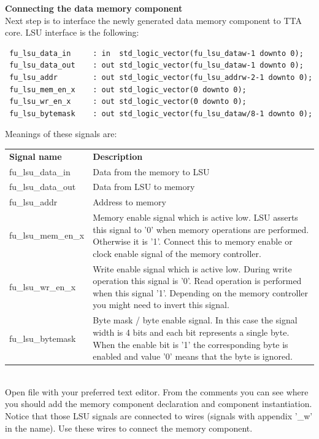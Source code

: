 \documentclass[twoside]{tceusermanual}
\begin{document}
\textbf{Connecting the data memory component} \\
Next step is to interface the newly generated data memory component to TTA
core. LSU interface is the following:
\begin{verbatim}
 fu_lsu_data_in     : in  std_logic_vector(fu_lsu_dataw-1 downto 0);
 fu_lsu_data_out    : out std_logic_vector(fu_lsu_dataw-1 downto 0);
 fu_lsu_addr        : out std_logic_vector(fu_lsu_addrw-2-1 downto 0);
 fu_lsu_mem_en_x    : out std_logic_vector(0 downto 0);
 fu_lsu_wr_en_x     : out std_logic_vector(0 downto 0);
 fu_lsu_bytemask    : out std_logic_vector(fu_lsu_dataw/8-1 downto 0);
\end{verbatim}

Meanings of these signals are:

\begin{tabular}{p{}p{}}
 \textbf{Signal name} & \textbf{Description} \\
 fu\_lsu\_data\_in & Data from the memory to LSU \\
 fu\_lsu\_data\_out & Data from LSU to memory \\
 fu\_lsu\_addr & Address to memory \\
 fu\_lsu\_mem\_en\_x & Memory enable signal which is active low. LSU asserts
 this signal to '0' when memory operations are performed. Otherwise it is '1'.
 Connect this to memory enable or clock enable signal of the memory
 controller. \\
 fu\_lsu\_wr\_en\_x & Write enable signal which is active low. During write
 operation this signal is '0'. Read operation is performed when this signal
 '1'. Depending on the memory controller you might need to invert this
 signal. \\
 fu\_lsu\_bytemask & Byte mask / byte enable signal. In this case the signal
 width is 4 bits and each bit represents a single byte. When the enable bit is
 '1' the corresponding byte is enabled and value '0' means that the byte is
 ignored. \\
\end{tabular} \\

Open file  with your preferred text editor.
From the comments you can see where you should add the memory component
declaration and component instantiation. Notice that those LSU signals are 
connected to wires (signals with appendix '\_w' in the name). Use these wires
to connect the memory component.
\end{document}
